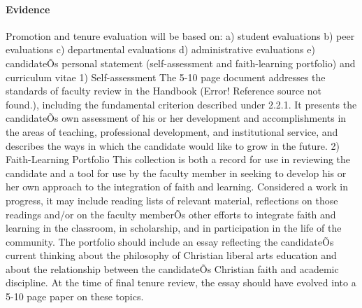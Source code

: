 \documentclass[letterpaper, 11pt]{article}
\begin{document}
			\paragraph{Evidence}
				Promotion and tenure evaluation will be based on:
				a) student evaluations
				b) peer evaluations
				c) departmental evaluations
				d) administrative evaluations
				e) candidateÕs personal statement (self-assessment and faith-learning portfolio) and curriculum vitae
				1) Self-assessment
				The 5-10 page document addresses the standards of faculty review in the Handbook (Error! Reference source not found.), including the fundamental criterion described under 2.2.1.  It presents the candidateÕs own assessment of his or her development and accomplishments in the areas of teaching, professional development, and institutional service, and describes the ways in which the candidate would like to grow in the future.
				2) Faith-Learning Portfolio
				This collection is both a record for use in reviewing the candidate and a tool for use by the faculty member in seeking to develop his or her own approach to the integration of faith and learning.  Considered a work in progress, it may include reading lists of relevant material, reflections on those readings and/or on the faculty memberÕs other efforts to integrate faith and learning in the classroom, in scholarship, and in participation in the life of the community.  The portfolio should include an essay reflecting the candidateÕs current thinking about the philosophy of Christian liberal arts education and about the relationship between the candidateÕs Christian faith and academic discipline.  At the time of final tenure review, the essay should have evolved into a 5-10 page paper on these topics.
\end{document}
